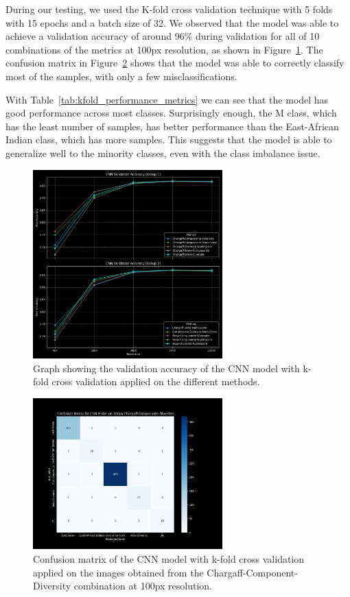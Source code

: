 During our testing, we used the K-fold cross validation technique with 5 folds with 15 epochs and a batch size of 32. We observed that the model
was able to achieve a validation accuracy of around 96\% during validation for all of 10 combinations of the metrics at 100px resolution, as shown in
Figure~\ref{fig:kfold_accuracy}. The confusion matrix in Figure~\ref{fig:kfold_confusion_matrix} shows that the model was able to correctly classify
most of the samples, with only a few misclassifications.

With Table~\ref{tab:kfold_performance_metrics} we can see that the model has good performance across most classes. Surprisingly enough, the M class,
which has the least number of samples, has better performance than the East-African Indian class, which has more samples. This suggests that the model
is able to generalize well to the minority classes, even with the class imbalance issue.

\begin{figure}[H]
	\centering
	\includegraphics[width=0.65\textwidth]{../imgs/graphs/kfold/cnn_validation_accuracy_groups_mask_5_kfold_std.png}
	\caption{Graph showing the validation accuracy of the CNN model with k-fold cross validation applied on the different methods.}
	\label{fig:kfold_accuracy}
\end{figure}

\begin{figure}[H]
	\centering
	\includegraphics[width=0.65\textwidth]{../imgs/graphs/kfold/cnn_confusion_matrix_100px_mask_5-kfold_std.png}
	\caption{Confusion matrix of the CNN model with k-fold cross validation applied on the images obtained from the Chargaff-Component-Diversity
		combination at 100px resolution.}
	\label{fig:kfold_confusion_matrix}
\end{figure}

